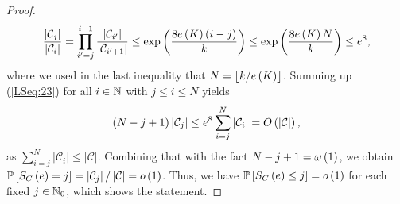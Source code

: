 \begin{proof}
\begin{align}\label{LSeq:23}
\frac{\left|\mathcal{C}_j\right|}{\left|\mathcal{C}_i\right|}=\prod_{i'=j}^{i-1}\frac{\left|\mathcal{C}_{i'}\right|}{\left|\mathcal{C}_{i'+1}\right|}\leq \exp\left(\frac{8e\left({K}\right)(i-j)}{k}\right)\leq  \exp\left(\frac{8e\left({K}\right)N}{k}\right) \leq e^8,
\end{align}
where we used in the last inequality that $N=\lfloor k/e\left({K}\right)\rfloor$.
Summing up (\ref{LSeq:23}) for all $i\in\mathbb{N}$ with $j\leq i\leq N$ yields  
\begin{align*}
	(N-j+1)\left|\mathcal{C}_j\right| \leq e^8\sum_{i=j}^{N}\left|\mathcal{C}_i\right|=O\left(\left|\mathcal{C}\right|\right),
\end{align*}
as $\sum_{i=j}^{N}\left|\mathcal{C}_i\right|\leq \left|\mathcal{C}\right|$. Combining that with the fact $N-j+1=\omega\left(1\right)$, we obtain $\mathbb{P}\left[S_{C}\left(e\right)=j\right]=\left|\mathcal{C}_j\right|/\left|\mathcal{C}\right|=o\left(1\right)$. Thus, we have $\mathbb{P}\left[S_{C}\left(e\right)\leq j\right]=o\left(1\right)$ for each fixed $j\in \mathbb{N}_0$, which shows the statement.
\end{proof}
